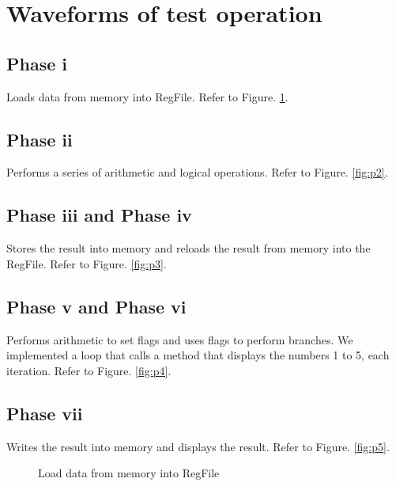 \documentclass[11pt]{article}
\begin{document}
\section{ Waveforms of test operation }
\subsection{Phase i}
Loads data from memory into RegFile. Refer to Figure. \ref{fig:p1}. 

\subsection{Phase ii}
Performs a series of arithmetic and logical operations. Refer to Figure. \ref{fig:p2}. 

\subsection{Phase iii and Phase iv}
Stores the result into memory and reloads the result from memory into the RegFile.  Refer to Figure. \ref{fig:p3}. 

\subsection{Phase v and Phase vi}
Performs arithmetic to set flags and uses flags to perform branches. We implemented a loop that calls a method that displays the numbers 1 to 5, each iteration. Refer to Figure. \ref{fig:p4}. 

\subsection{Phase vii}
Writes the result into memory and displays the result. Refer to Figure. \ref{fig:p5}. 

\begin{center}
\begin{figure}
\caption{Load data from memory into RegFile}
\label{fig:p1}
\end{figure} 
\end{center}
\end{document}
